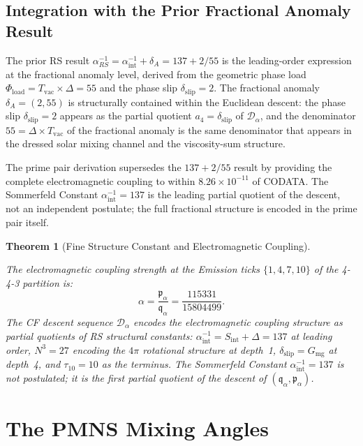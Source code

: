 \documentclass[11pt,letterpaper]{article}
\theoremstyle{plain}
\newtheorem{theorem}{Theorem}[section]
\theoremstyle{definition}
\theoremstyle{remark}
\newcommand{\Sint}{S_{\mathrm{int}}}
\newcommand{\Gmg}{G_{\mathrm{mg}}}
\newcommand{\dslip}{\delta_{\mathrm{slip}}}
\newcommand{\Tvac}{T_{\mathrm{vac}}}
\newcommand{\tauX}{\tau_{10}}
\newcommand{\aSC}{\alpha^{-1}_{\mathrm{int}}}
\newcommand{\pa}{\mathfrak{p}_\alpha}
\newcommand{\qa}{\mathfrak{q}_\alpha}
\newcommand{\Da}{\mathcal{D}_\alpha}
\newcommand{\dA}{\delta_A}
\begin{document}
\subsection{Integration with the Prior Fractional Anomaly Result}

The prior RS result $\alpha^{-1}_{RS}=\aSC+\dA=137+2/55$ is the
leading-order expression at the fractional anomaly level, derived
from the geometric phase load $\Phi_{\mathrm{load}}=\Tvac\times\Delta=55$
and the phase slip $\dslip=2$.  The fractional anomaly $\dA=(2,55)$
is structurally contained within the Euclidean descent: the phase
slip $\dslip=2$ appears as the partial quotient $a_4=\dslip$ of
$\Da$, and the denominator $55=\Delta\times\Tvac$ of the fractional
anomaly is the same denominator that appears in the dressed solar
mixing channel and the viscosity-sum structure.

The prime pair derivation supersedes the $137+2/55$ result by
providing the complete electromagnetic coupling to within
$8.26\times10^{-11}$ of CODATA.  The Sommerfeld Constant $\aSC=137$
is the leading partial quotient of the descent, not an independent
postulate; the full fractional structure is encoded in the prime pair
itself.

\begin{theorem}[Fine Structure Constant and Electromagnetic
Coupling]\label{thm:alpha-integration}
\begin{rsbox}
The electromagnetic coupling strength at the Emission ticks
$\{1,4,7,10\}$ of the 4-4-3 partition is:
\[
\alpha = \frac{\pa}{\qa} = \frac{115331}{15804499}.
\]
The CF descent sequence $\Da$ encodes the electromagnetic coupling
structure as partial quotients of RS structural constants:
$\aSC=\Sint+\Delta=137$ at leading order, $N^3=27$ encoding the
$4\pi$ rotational structure at depth~1, $\dslip=\Gmg$ at depth~4,
and $\tauX=10$ as the terminus.  The Sommerfeld Constant $\aSC=137$
is not postulated; it is the first partial quotient of the descent
of $(\qa,\pa)$.
\end{rsbox}
\end{theorem}


\section{The PMNS Mixing Angles}\label{sec:pmns}
\end{document}
